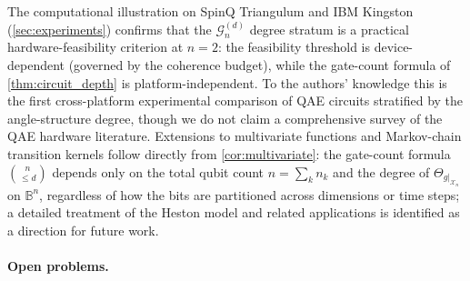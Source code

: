 \documentclass[12pt,a4paper]{article}
\theoremstyle{plain}
\theoremstyle{definition}
\theoremstyle{remark}
\newcommand{\Gclass}[2]{\mathcal{G}_{#1}^{(#2)}}
\begin{document}
The computational illustration on SpinQ Triangulum and IBM Kingston
(\cref{sec:experiments}) confirms that the $\Gclass{n}{d}$ degree
stratum is a practical hardware-feasibility criterion at $n=2$: the
feasibility threshold is device-dependent (governed by the coherence
budget), while the gate-count formula of \cref{thm:circuit_depth} is
platform-independent.
To the authors' knowledge this is the first cross-platform experimental
comparison of QAE circuits stratified by the angle-structure degree,
though we do not claim a comprehensive survey of the QAE hardware
literature.
Extensions to multivariate functions and Markov-chain transition kernels
follow directly from \cref{cor:multivariate}: the gate-count formula
$\binom{n}{\leq d}$ depends only on the total qubit count $n=\sum_k n_k$
and the degree of $\Theta_{g|_{\mathcal{X}_n}}$ on $\mathbb{B}^n$,
regardless of how the bits are partitioned across dimensions or time steps;
a detailed treatment of the Heston model and related applications is
identified as a direction for future work.

\paragraph{Open problems.}
\end{document}
